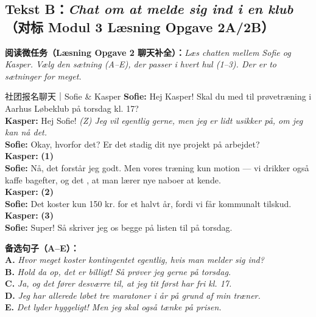 \subsection*{Tekst B：\textit{Chat om at melde sig ind i en klub}（对标 Modul 3 Læsning Opgave 2A/2B）}

\textbf{阅读微任务（Læsning Opgave 2 聊天补全）：}\textit{Læs chatten mellem Sofie og Kasper. Vælg den sætning (A--E), der passer i hvert hul (1--3). Der er to sætninger for meget.}

\begin{emailbox}{社团报名聊天｜Sofie \& Kasper}
\textbf{Sofie:} Hej Kasper! Skal du med til prøvetræning i Aarhus Løbeklub på torsdag kl. 17?\\
\textbf{Kasper:} Hej Sofie! \textit{(Z) Jeg vil egentlig gerne, men jeg er lidt usikker på, om jeg kan nå det.}\\
\textbf{Sofie:} Okay, hvorfor det? Er det stadig  dit nye projekt på arbejdet?\\
\textbf{Kasper:} \underline{\hspace{2.8cm}} \textbf{(1)}\\
\textbf{Sofie:} Nå, det forstår jeg godt. Men vores træning  kun motion --- vi drikker også kaffe bagefter, og det , at man lærer nye naboer at kende.\\
\textbf{Kasper:} \underline{\hspace{2.8cm}} \textbf{(2)}\\
\textbf{Sofie:} Det koster kun 150 kr. for et halvt år, fordi vi får kommunalt tilskud.\\
\textbf{Kasper:} \underline{\hspace{2.8cm}} \textbf{(3)}\\
\textbf{Sofie:} Super! Så skriver jeg os begge på listen til på torsdag.
\end{emailbox}

\noindent\small\textbf{备选句子（A--E）：}\\
\textbf{A.} \textit{Hvor meget koster kontingentet egentlig, hvis man melder sig ind?}\\
\textbf{B.} \textit{Hold da op, det er billigt! Så prøver jeg gerne på torsdag.}\\
\textbf{C.} \textit{Ja, og det fører desværre til, at jeg tit først har fri kl. 17.}\\
\textbf{D.} \textit{Jeg har allerede løbet tre maratoner i år på grund af min træner.}\\
\textbf{E.} \textit{Det lyder hyggeligt! Men jeg skal også tænke på prisen.}

